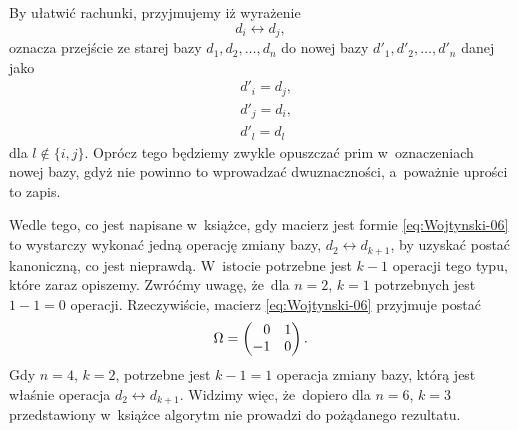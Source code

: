 \documentclass[a4paper,11pt]{article}
\numberwithin{equation}{section}
\begin{document}
By ułatwić rachunki, przyjmujemy iż wyrażenie
\begin{equation}
  \label{eq:Wojtynski-14}
  d_{ i } \leftrightarrow d_{ j },
\end{equation}
oznacza przejście ze starej bazy $d_{ 1 }, d_{ 2 }, \ldots, d_{ n }$ do nowej bazy
$d'_{ 1 }, d'_{ 2 }, \ldots, d'_{ n }$ danej jako
\begin{subequations}
  \begin{align}
    \label{eq:Wojtynski-15-A}
    &d'_{ i } = d_{ j }, \\
    \label{eq:Wojtynski-15-B}
    &d'_{ j } = d_{ i }, \\
    \label{eq:Wojtynski-15-C}
    &d'_{ l } = d_{ l }
  \end{align}
\end{subequations}
dla $l \notin \{ i, j \}$. Oprócz tego będziemy zwykle opuszczać prim
w~oznaczeniach nowej bazy, gdyż nie powinno to wprowadzać dwuznaczności,
a~poważnie uprości to zapis.

Wedle tego, co jest napisane w~książce, gdy macierz jest formie
\eqref{eq:Wojtynski-06} to wystarczy wykonać jedną operację zmiany bazy,
$d_{ 2 } \leftrightarrow d_{ k + 1 }$, by uzyskać postać kanoniczną, co jest nieprawdą.
W~istocie potrzebne jest $k - 1$ operacji tego typu, które zaraz opiszemy.
Zwróćmy uwagę, że~dla $n = 2$, $k = 1$ potrzebnych jest $1 - 1 = 0$
operacji. Rzeczywiście, macierz \eqref{eq:Wojtynski-06} przyjmuje postać
\begin{equation}
  \label{eq:Wojtynski-16}
  \Omega =
  \begin{pmatrix}
    \hphantom{-} 0 & 1 \\
    -1 & 0
  \end{pmatrix}.
\end{equation}
Gdy $n = 4$, $k = 2$, potrzebne jest $k - 1 = 1$ operacja zmiany bazy,
którą jest właśnie operacja $d_{ 2 } \leftrightarrow d_{ k + 1 }$. Widzimy więc, że~dopiero
dla $n = 6$, $k = 3$ przedstawiony w~książce algorytm nie prowadzi
do pożądanego rezultatu.
\end{document}

